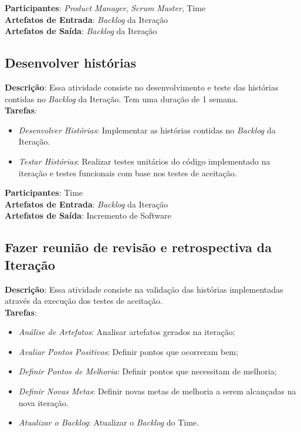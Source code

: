   \textbf{Participantes}: \textit{Product Manager}, \textit{Scrum Master}, Time\\

  \textbf{Artefatos de Entrada}: \textit{Backlog} da Iteração \\

  \textbf{Artefatos de Saída}:   \textit{Backlog} da Iteração\\

\subsection{Desenvolver histórias}
  \textbf{Descrição}: Essa atividade consiste no desenvolvimento e teste das histórias contidas no \textit{Backlog} da Iteração. Tem uma duração de 1 semana. \\

  \textbf{Tarefas}:

  \begin{itemize}
    \item \indent \textit{Desenvolver Histórias}: Implementar as histórias contidas no \textit{Backlog} da Iteração.

   \item \indent \textit{Testar Histórias}: Realizar testes unitários do código implementado na iteração e testes funcionais
   com base nos testes de aceitação.
  \end{itemize}

  \textbf{Participantes}: Time\\

  \textbf{Artefatos de Entrada}: \textit{Backlog} da Iteração \\

  \textbf{Artefatos de Saída}:   Incremento de Software\\

\subsection{Fazer reunião de revisão e retrospectiva da Iteração}
  \textbf{Descrição}: Essa atividade consiste na validação das histórias implementadas através da execução dos testes de aceitação. \\

  \textbf{Tarefas}:
  \begin{itemize}
   \item \indent \textit{Análise de Artefatos}: Analisar artefatos gerados na iteração;

   \item \indent \textit{Avaliar Pontos Positivos}: Definir pontos que ocorreram bem;

   \item \indent \textit{Definir Pontos de Melhoria}: Definir pontos que necessitam de melhoria;

   \item \indent \textit{Definir Novas Metas}: Definir novas metas de melhoria a serem alcançadas na nova iteração.
   
   \item \indent \textit{Atualizar o \textit{Backlog}}: Atualizar o \textit{Backlog} do Time.
  \end{itemize}

